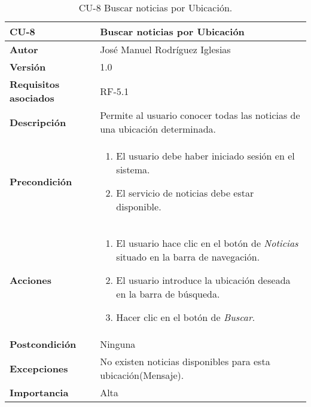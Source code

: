 \begin{table}[h]
	\centering
	\begin{tabularx}{\linewidth}{ p{} p{} }
		\toprule
		\textbf{CU-8}    & \textbf{Buscar noticias por Ubicación}\\
		\toprule
            \textbf{Autor}                & José Manuel Rodríguez Iglesias \\
		\textbf{Versión}              & 1.0    \\
		\textbf{Requisitos asociados} & RF-5.1 \\
		\textbf{Descripción}          & Permite al usuario conocer todas las noticias de una ubicación determinada. \\
		\textbf{Precondición}         &  
            \begin{enumerate}
			\def\labelenumi{\arabic{enumi}.}
			\tightlist
			\item El usuario debe haber iniciado sesión en el sistema.
			\item El servicio de noticias debe estar disponible.
		\end{enumerate}\\
    
  
		\textbf{Acciones}             &
		\begin{enumerate}
			\def\labelenumi{\arabic{enumi}.}
			\tightlist
                \item El usuario hace clic en el botón de\textit{ Noticias} situado en la barra de navegación.
			\item El usuario introduce la ubicación deseada en la barra de búsqueda. 
                \item Hacer clic en el botón de \textit{Buscar}.
		\end{enumerate}\\
		\textbf{Postcondición}        & Ninguna \\
		\textbf{Excepciones}          & No existen noticias disponibles para esta ubicación(Mensaje). \\
		\textbf{Importancia}          & Alta\\
		\bottomrule
	\end{tabularx}
	\caption{CU-8 Buscar noticias por Ubicación.}
\end{table}

